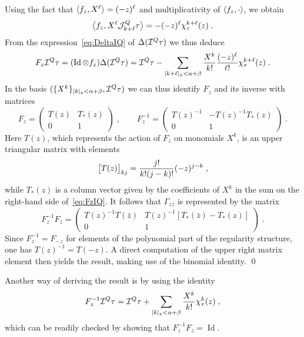 \documentclass[reqno,11pt]{article}
\DeclareMathOperator{\Id}{Id}           %
\def\abss#1{\abs{#1}_\mathfrak{s}}
\begin{document}
Using the fact that $\langle f_z,X^\ell\rangle = (-z)^\ell$ and multiplicativity of
$\langle f_z,\cdot\rangle$, we obtain 
\begin{equation}
 \big\langle f_z,X^\ell{\mathcal J}^Q_{k+\ell}\tau\big\rangle = -(-z)^\ell
\chi^{k+\ell}_\tau(z)\;.
\end{equation} 
From the expression~\eqref{eq:DeltaIQ} of $\Delta({\mathcal I}^Q\tau) $ we thus deduce 
\begin{equation}
\label{eq:FzIQ} 
F_z \cI^Q\tau 
= (\Id\otimes f_z)\Delta(\cI^Q\tau) 
= \cI^Q\tau - \sum_{\abss{k+\ell}<\alpha+\beta} \frac{X^k}{k!} 
\frac{(-z)^\ell}{\ell!} \chi_\tau^{k+\ell}(z)\;.
\end{equation}
In the basis $(\set{X^k}_{\abss{k}<\alpha+\beta},\cI^Q\tau)$ we can thus
identify $F_z$ and its inverse with matrices 
\begin{equation}
 F_z = 
 \begin{pmatrix}
 T(z) & T_*(z) \\ 0 & 1  
 \end{pmatrix}\;, 
 \qquad
 F_z^{-1} = 
 \begin{pmatrix}
 T(z)^{-1} & -T(z)^{-1}T_*(z) \\ 0 & 1  
 \end{pmatrix}\;.
\end{equation} 
Here $T(z)$, which represents the action of $F_z$ on monomials $X^k$, is an
upper triangular matrix with elements 
\begin{equation}
 \bigl[T(z)\bigr]_{kj} = \frac{j!}{k!(j-k)!}(-z)^{j-k}\;,
\end{equation}
while $T_*(z)$ is a column vector given by the coefficients of $X^k$ in the sum
on the right-hand side of~\eqref{eq:FzIQ}. 
It follows that $\Gamma_{z\bar z}$ is represented by the matrix 
\begin{equation}
 F_z^{-1} F_{\bar z} =
 \begin{pmatrix}
 T(z)^{-1}T(\bar z) & T(z)^{-1}[T_*(\bar z) - T_*(z)] \\ 
 0 & 1
 \end{pmatrix}\;.
\end{equation} 
Since $F_z^{-1} = F_{-z}$ for elements of the polynomial part 
of the regularity structure, one has $T(z)^{-1}=T(-z)$. A direct computation of
the upper right matrix element then yields the result, making use of the
binomial identity. 
\qed

\begin{remark}
Another way of deriving the result is by using the identity 
\begin{equation}
 F_z^{-1} \cI^Q\tau = \cI^Q\tau 
 + \sum_{\abss{k} < \alpha+\beta} \frac{X^k}{k!} \chi^k_\tau(z)\;,
\end{equation} 
which can be readily checked by showing that $F_z^{-1}F_z = \Id$. 
\end{remark}
\end{document}
